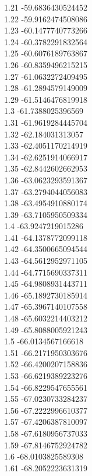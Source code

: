 {1.21	-59.6836430524452\\
1.22	-59.9162474508086\\
1.23	-60.1477740773266\\
1.24	-60.3782291832564\\
1.25	-60.6076189763867\\
1.26	-60.8359496215215\\
1.27	-61.0632272409495\\
1.28	-61.2894579149009\\
1.29	-61.5146476819918\\
1.3	-61.7388025396569\\
1.31	-61.9619284445704\\
1.32	-62.184031313057\\
1.33	-62.4051170214919\\
1.34	-62.6251914066917\\
1.35	-62.8442602662953\\
1.36	-63.0623293591367\\
1.37	-63.2794044056083\\
1.38	-63.4954910880174\\
1.39	-63.7105950509334\\
1.4	-63.9247219015286\\
1.41	-64.1378772099118\\
1.42	-64.3500665094544\\
1.43	-64.5612952971105\\
1.44	-64.7715690337311\\
1.45	-64.9808931443711\\
1.46	-65.1892730185914\\
1.47	-65.3967140107558\\
1.48	-65.6032214403212\\
1.49	-65.8088005921243\\
1.5	-66.0134567166618\\
1.51	-66.2171950303676\\
1.52	-66.4200207158836\\
1.53	-66.6219389223276\\
1.54	-66.8229547655561\\
1.55	-67.0230733284237\\
1.56	-67.2222996610377\\
1.57	-67.4206387810097\\
1.58	-67.6180956737033\\
1.59	-67.8146752924782\\
1.6	-68.0103825589308\\
1.61	-68.2052223631319\\
}
